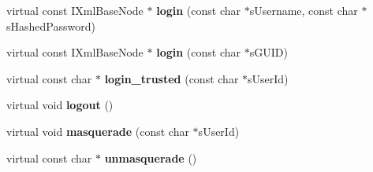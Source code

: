 \begin{DoxyCompactItemize}
\item 
\hypertarget{classgeneral__server_1_1AdminSecurityContext_a9289cb528fb8f83fe70dc0e699585ee7}{virtual const \-I\-Xml\-Base\-Node $\ast$ {\bfseries login} (const char $\ast$s\-Username, const char $\ast$s\-Hashed\-Password)}\label{classgeneral__server_1_1AdminSecurityContext_a9289cb528fb8f83fe70dc0e699585ee7}

\item 
\hypertarget{classgeneral__server_1_1AdminSecurityContext_a445d5a66eaaf8e1123680d9cf7d28700}{virtual const \-I\-Xml\-Base\-Node $\ast$ {\bfseries login} (const char $\ast$s\-G\-U\-I\-D)}\label{classgeneral__server_1_1AdminSecurityContext_a445d5a66eaaf8e1123680d9cf7d28700}

\item 
\hypertarget{classgeneral__server_1_1AdminSecurityContext_a7293feff58ad78322c0c90706ac9ec03}{virtual const char $\ast$ {\bfseries login\-\_\-trusted} (const char $\ast$s\-User\-Id)}\label{classgeneral__server_1_1AdminSecurityContext_a7293feff58ad78322c0c90706ac9ec03}

\item 
\hypertarget{classgeneral__server_1_1AdminSecurityContext_a8b467221ccb6db4c1c2b2aa3d21f998d}{virtual void {\bfseries logout} ()}\label{classgeneral__server_1_1AdminSecurityContext_a8b467221ccb6db4c1c2b2aa3d21f998d}

\item 
\hypertarget{classgeneral__server_1_1AdminSecurityContext_a7537df82888dc853bf8669cf72e9eeb2}{virtual void {\bfseries masquerade} (const char $\ast$s\-User\-Id)}\label{classgeneral__server_1_1AdminSecurityContext_a7537df82888dc853bf8669cf72e9eeb2}

\item 
\hypertarget{classgeneral__server_1_1AdminSecurityContext_a08fbf8d249b945b67b18297bdd01ebb9}{virtual const char $\ast$ {\bfseries unmasquerade} ()}\label{classgeneral__server_1_1AdminSecurityContext_a08fbf8d249b945b67b18297bdd01ebb9}

\end{DoxyCompactItemize}
